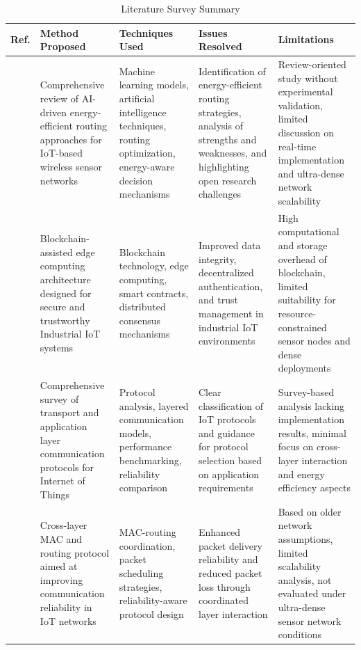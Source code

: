 \documentclass[a4paper,fleqn]{cas-dc}
\numberwithin{equation}{section}
\begin{document}
\begin{table}[htbp]
\centering
\caption{Literature Survey Summary}
\label{tab:literature_summary}
\footnotesize
\renewcommand{\arraystretch}{1.2}
\setlength{\extrarowheight}{2pt}
\begin{tabular}{|L{0.85cm}|L{3.4cm}|L{3.0cm}|L{3.2cm}|L{3.7cm}|}
\hline
\textbf{Ref.} & \textbf{Method Proposed} & \textbf{Techniques Used} & \textbf{Issues Resolved} & \textbf{Limitations} \\
\hline

\cite{Thakur2025} & Comprehensive review of AI-driven energy-efficient routing approaches for IoT-based wireless sensor networks & Machine learning models, artificial intelligence techniques, routing optimization, energy-aware decision mechanisms & Identification of energy-efficient routing strategies, analysis of strengths and weaknesses, and highlighting open research challenges & Review-oriented study without experimental validation, limited discussion on real-time implementation and ultra-dense network scalability \\
\hline

\cite{Asaithambi2025} & Blockchain-assisted edge computing architecture designed for secure and trustworthy Industrial IoT systems & Blockchain technology, edge computing, smart contracts, distributed consensus mechanisms & Improved data integrity, decentralized authentication, and trust management in industrial IoT environments & High computational and storage overhead of blockchain, limited suitability for resource-constrained sensor nodes and dense deployments \\
\hline

\cite{Petrescu2025} & Comprehensive survey of transport and application layer communication protocols for Internet of Things & Protocol analysis, layered communication models, performance benchmarking, reliability comparison & Clear classification of IoT protocols and guidance for protocol selection based on application requirements & Survey-based analysis lacking implementation results, minimal focus on cross-layer interaction and energy efficiency aspects \\
\hline

\cite{Kim2022} & Cross-layer MAC and routing protocol aimed at improving communication reliability in IoT networks & MAC-routing coordination, packet scheduling strategies, reliability-aware protocol design & Enhanced packet delivery reliability and reduced packet loss through coordinated layer interaction & Based on older network assumptions, limited scalability analysis, not evaluated under ultra-dense sensor network conditions \\
\hline


\end{tabular}
\end{table}
\end{document}
